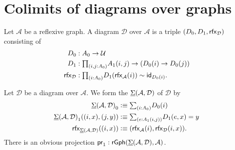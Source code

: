 \begin{comment}
\begin{thm}
Let $\mathcal{B}$ be a family of reflexive graphs over $\mathcal{A}$. The following are equivalent:
\begin{enumerate}
\item $\mathcal{B}$ is diagrammatic.
\item The morphism $\proj 1 : \mathsf{rGph}(\msm{\mathcal{A}}{\mathcal{B}},\mathcal{A})$ is a left fibration.
\item The morphism $\proj 1 : \mathsf{rGph}(\msm{\mathcal{A}}{\mathcal{B}},\mathcal{A})$ is left cartesian.
\end{enumerate}
\end{thm}

\begin{thm}\label{thm:fib_cart}
Let $\mathcal{B}$ be a family of reflexive graphs over $\mathcal{A}$. The following are equivalent:
\begin{enumerate}
\item $A$ is equifibered.
\item The morphism $\proj 1 : \mathsf{rGph}(\msm{\mathcal{A}}{\mathcal{B}},\mathcal{A})$ is a fibration.
\item The morphism $\proj 1 : \mathsf{rGph}(\msm{\mathcal{A}}{\mathcal{B}},\mathcal{A})$ is cartesian.
\end{enumerate}
\end{thm}
\end{comment}

\section{Colimits of diagrams over graphs}

\begin{defn}
Let $\mathcal{A}$ be a reflexive graph. A diagram $\mathcal{D}$ over $\mathcal{A}$ is a triple $(\pts{D},\edg{D},\rfx{\mathcal{D}})$ consisting of
\begin{align*}
\pts{D} & : \pts{A}\to \UU \\
\edg{D} & : \prd{i,j:\pts{A}} \edg{A}(i,j)\to (\pts{D}(i)\to \pts{D}(j)) \\
\rfx{\mathcal{D}} & : \prd{i:\pts{A}} \edg{D}(\rfx{\mathcal{A}}(i))\htpy \idfunc[\pts{D}(i)].
\end{align*}
\end{defn}

\begin{defn}
Let $\mathcal{D}$ be a diagram over $\mathcal{A}$. We form the  $\underline{\Sigma}(\mathcal{A},\mathcal{D})$ of $\mathcal{D}$ by
\begin{align*}
\pts{\msm{\mathcal{A}}{\mathcal{D}}} & \defeq \sm{i:\pts{A}}\pts{D}(i) \\
\edg{\msm{\mathcal{A}}{\mathcal{D}}}((i,x),(j,y)) & \defeq \sm{e:\edg{A}(i,j)} \edg{D}(e,x)=y \\
\rfx{\msm{\mathcal{A}}{\mathcal{D}}}((i,x)) & \defeq (\rfx{\mathcal{A}}(i),\rfx{\mathcal{D}}(i,x)).
\end{align*}
There is an obvious projection $\mathsf{pr}_{1} : \mathsf{rGph}(\underline{\Sigma}(\mathcal{A},\mathcal{D}),\mathcal{A})$.
\end{defn}

